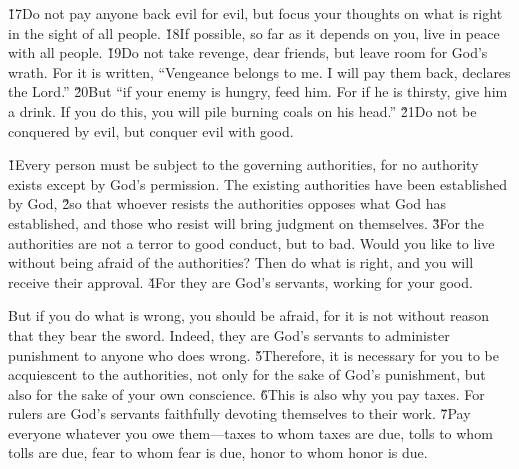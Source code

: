 \v{17}Do not pay anyone back evil for evil, but focus your thoughts on what is right in the sight of all people. \v{18}If possible, so far as it depends on you, live in peace with all people. \v{19}Do not take revenge, dear friends, but leave room for God's wrath. For it is written, ``Vengeance belongs to me. I will pay them back, declares the Lord.'' \v{20}But ``if your enemy is hungry, feed him. For if he is thirsty, give him a drink. If you do this, you will pile burning coals on his head.'' \v{21}Do not be conquered by evil, but conquer evil with good.

\v{1}Every person must be subject to the governing authorities, for no authority exists except by God's permission. The existing authorities have been established by God, \v{2}so that whoever resists the authorities opposes what God has established, and those who resist will bring judgment on themselves. \v{3}For the authorities are not a terror to good conduct, but to bad. Would you like to live without being afraid of the authorities? Then do what is right, and you will receive their approval. \v{4}For they are God's servants, working for your good.

But if you do what is wrong, you should be afraid, for it is not without reason that they bear the sword. Indeed, they are God's servants to administer punishment to anyone who does wrong. \v{5}Therefore, it is necessary for you to be acquiescent to the authorities, not only for the sake of God's punishment, but also for the sake of your own conscience. \v{6}This is also why you pay taxes. For rulers are God's servants faithfully devoting themselves to their work. \v{7}Pay everyone whatever you owe them---taxes to whom taxes are due, tolls to whom tolls are due, fear to whom fear is due, honor to whom honor is due.

